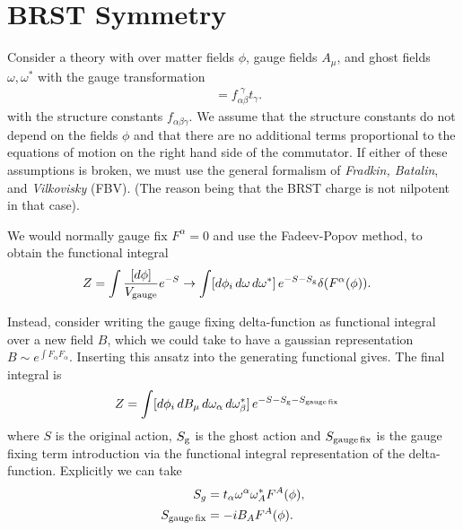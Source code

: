 \documentclass[notitlepage,amsmath,amssymb,aps, pra, 10pt]{revtex4-1}
\begin{document}
\section{BRST Symmetry}
    Consider a theory with over matter fields $\phi$, gauge fields $A_{\mu}$, and ghost fields $\omega, \omega^*$ with the gauge transformation
    \begin{align}
        [t_{\alpha}, t_{\beta}] &= f^{\,\,\gamma}_{\alpha\beta} t_{\gamma}.
    \end{align}
    with the structure constants $f_{\alpha\beta\gamma}$. We assume that the structure constants do not depend on the fields $\phi$ and that there are no additional terms proportional to the equations of motion on the right hand side of the commutator. If either of these assumptions is broken, we must use the general formalism of \emph{Fradkin, Batalin}, and \emph{Vilkovisky} (FBV). (The reason being that the BRST charge is not nilpotent in that case).

    We would normally gauge fix $F^{\alpha} = 0$ and use the Fadeev-Popov method, to obtain the functional integral
    \begin{align}
        Z &= \int \frac{[d\phi] }{V_{\rm gauge}}e^{-S} \rightarrow \int [d \phi_i\, d\omega \,d\omega^*]\, e^{-S  -S_{\rm g}} \delta(F^{\alpha}(\phi)).
    \end{align}

    Instead, consider writing the gauge fixing delta-function as functional integral over a new field $B$, which we could take to have a gaussian representation $B \sim e^{\int F_{\alpha}F_{\alpha}}$. Inserting this ansatz into the generating functional gives. The final integral is
        \begin{align}
        Z &= \int [d \phi_i\, dB_{\mu} \, d\omega_{\alpha} \,d\omega_{\beta}^*]\, e^{-S  -S_{\rm g} - S_{\rm gauge\,fix}}
    \end{align}
    where $S$ is the original action, $S_{\rm g}$ is the ghost action and $S_{\rm gauge\,fix}$ is the gauge fixing term introduction via the functional integral representation of the delta-function. Explicitly we can take
    \begin{align}
        S_{g} &= t_{\alpha} {\omega}^{\alpha}  \omega_A^* F^{A}(\phi),\\
        S_{\rm gauge\,fix} &=-i B_A F^{A}(\phi).
    \end{align}
\end{document}
